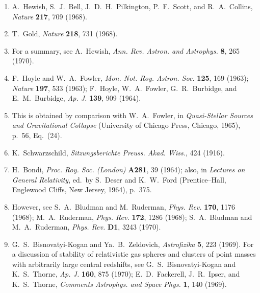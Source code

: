 \begin{enumerate}
  \item {}\label{ch11-ref-20}
  A.~Hewish, S.~J.~Bell, J.~D.~H.~Pilkington, P.~F.~Scott, and
  R.~A.~Collins, \emph{Nature} \textbf{217}, 709 (1968).

  \item {}\label{ch11-ref-21}
  T.~Gold, \emph{Nature} \textbf{218}, 731 (1968).

  \item {}\label{ch11-ref-22}
  For a summary, see A.~Hewish, \emph{Ann. Rev. Astron. and Astrophys.}
  \textbf{8}, 265 (1970).

  \item {}\label{ch11-ref-23}
  F.~Hoyle and W.~A.~Fowler, \emph{Mon. Not. Roy. Astron. Soc.}
  \textbf{125}, 169 (1963); \emph{Nature} \textbf{197}, 533 (1963);
  F.~Hoyle, W.~A.~Fowler, G.~R.~Burbidge, and E.~M.~Burbidge,
  \emph{Ap. J.} \textbf{139}, 909 (1964).

  \item {}\label{ch11-ref-24}
  This is obtained by comparison with W.~A.~Fowler, in
  \emph{Quasi-Stellar Sources and Gravitational Collapse} (University of
  Chicago Press, Chicago, 1965), p.~56, Eq.~(24).

  \item {}\label{ch11-ref-25}
  K.~Schwarzschild, \emph{Sitzungsberichte Preuss. Akad. Wiss.}, 424
  (1916).

  \item {}\label{ch11-ref-26}
  H.~Bondi, \emph{Proc. Roy. Soc. (London)} \textbf{A281}, 39 (1964);
  also, in \emph{Lectures on General Relativity}, ed.\ by S.~Deser and
  K.~W.~Ford (Prentice--Hall, Englewood Cliffs, New Jersey, 1964),
  p.~375.

  \item {}\label{ch11-ref-27}
  However, see S.~A.~Bludman and M.~Ruderman, \emph{Phys. Rev.}
  \textbf{170}, 1176 (1968); M.~A.~Ruderman, \emph{Phys. Rev.}
  \textbf{172}, 1286 (1968); S.~A.~Bludman and M.~A.~Ruderman,
  \emph{Phys. Rev.} \textbf{D1}, 3243 (1970).

  \item {}\label{ch11-ref-28}
  G.~S.~Bisnovatyi-Kogan and Ya.~B.~Zeldovich, \emph{Astrofizika}
  \textbf{5}, 223 (1969). For a discussion of stability of relativistic
  gas spheres and clusters of point masses with arbitrarily large central
  redshifts, see G.~S.~Bisnovatyi-Kogan and K.~S.~Thorne, \emph{Ap. J.}
  \textbf{160}, 875 (1970); E.~D.~Fackerell, J.~R.~Ipser, and
  K.~S.~Thorne, \emph{Comments Astrophys. and Space Phys.} \textbf{1},
  140 (1969).


\end{enumerate}
